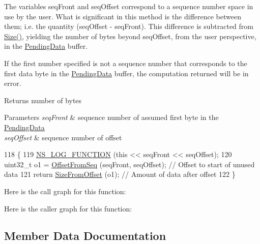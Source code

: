 The variables seq\+Front and seq\+Offset correspond to a sequence number space in use by the user. What is significant in this method is the difference between them; i.\+e. the quantity (seq\+Offset -\/ seq\+Front). This difference is subtracted from \hyperlink{classns3_1_1PendingData_abbbae5f8a12762f9a85d2ddd5c9c9165}{Size()}, yielding the number of bytes beyond seq\+Offset, from the user perspective, in the \hyperlink{classns3_1_1PendingData}{Pending\+Data} buffer.

If the first number specified is not a sequence number that corresponds to the first data byte in the \hyperlink{classns3_1_1PendingData}{Pending\+Data} buffer, the computation returned will be in error.

\begin{DoxyReturn}{Returns}
number of bytes 
\end{DoxyReturn}

\begin{DoxyParams}{Parameters}
{\em seq\+Front} & sequence number of assumed first byte in the \hyperlink{classns3_1_1PendingData}{Pending\+Data} \\
\hline
{\em seq\+Offset} & sequence number of offset \\
\hline
\end{DoxyParams}

\begin{DoxyCode}
118 \{
119   \hyperlink{log-macros-disabled_8h_a90b90d5bad1f39cb1b64923ea94c0761}{NS\_LOG\_FUNCTION} (\textcolor{keyword}{this} << seqFront << seqOffset);
120   uint32\_t o1 = \hyperlink{classns3_1_1PendingData_ac537be2c08b079744b3b74cd70a5a66c}{OffsetFromSeq} (seqFront, seqOffset); \textcolor{comment}{// Offset to start of unused data}
121   \textcolor{keywordflow}{return} \hyperlink{classns3_1_1PendingData_a7224d2492c18490d1b75411db218949a}{SizeFromOffset} (o1);      \textcolor{comment}{// Amount of data after offset}
122 \}
\end{DoxyCode}


Here is the call graph for this function\+:




Here is the caller graph for this function\+:




\subsection{Member Data Documentation}
